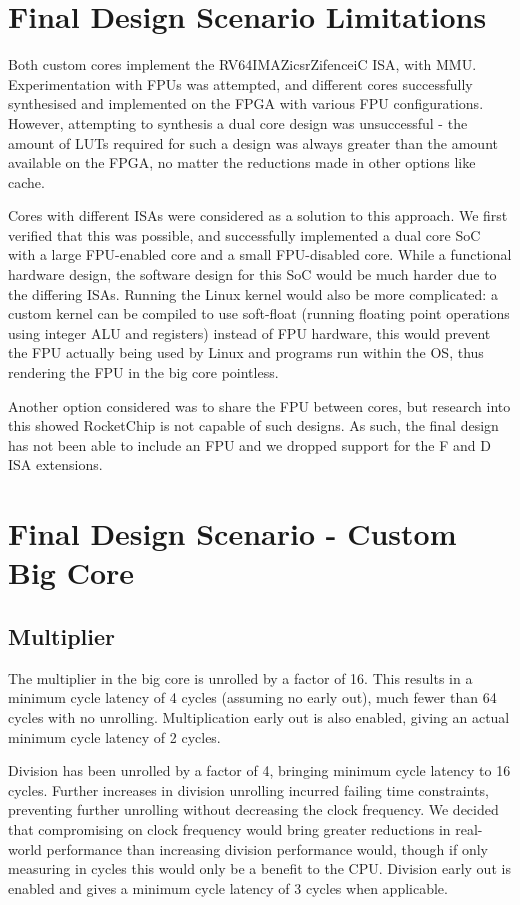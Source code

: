 \section{Final Design Scenario Limitations}
Both custom cores implement the RV64IMAZicsrZifenceiC ISA, with MMU. Experimentation with FPUs was attempted, and different cores successfully synthesised and implemented on the FPGA with various FPU configurations. However, attempting to synthesis a dual core design was unsuccessful - the amount of LUTs required for such a design was always greater than the amount available on the FPGA, no matter the reductions made in other options like cache.

Cores with different ISAs were considered as a solution to this approach. We first verified that this was possible, and successfully implemented a dual core SoC with a large FPU-enabled core and a small FPU-disabled core. While a functional hardware design, the software design for this SoC would be much harder due to the differing ISAs. Running the Linux kernel would also be more complicated: a custom kernel can be compiled to use soft-float (running floating point operations using integer ALU and registers) instead of FPU hardware, this would prevent the FPU actually being used by Linux and programs run within the OS, thus rendering the FPU in the big core pointless.

Another option considered was to share the FPU between cores, but research into this showed RocketChip is not capable of such designs. As such, the final design has not been able to include an FPU and we dropped support for the F and D ISA extensions.


\section{Final Design Scenario - Custom Big Core}
\subsection{Multiplier} %
The multiplier in the big core is unrolled by a factor of 16. This results in a minimum cycle latency of 4 cycles (assuming no early out), much fewer than 64 cycles with no unrolling. Multiplication early out is also enabled, giving an actual minimum cycle latency of 2 cycles.

Division has been unrolled by a factor of 4, bringing minimum cycle latency to 16 cycles. Further increases in division unrolling incurred failing time constraints, preventing further unrolling without decreasing the clock frequency. We decided that compromising on clock frequency would bring greater reductions in real-world performance than increasing division performance would, though if only measuring in cycles this would only be a benefit to the CPU. Division early out is enabled and gives a minimum cycle latency of 3 cycles when applicable.

